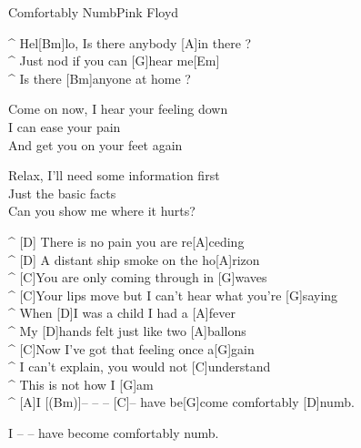 \begin{song}{Comfortably Numb}{Pink Floyd}

\begin{guitar}
^ Hel[Bm]lo, Is there anybody [A]in there ?\\
^ Just nod if you can [G]hear me[Em]\\
^ Is there [Bm]anyone at home ?\\
\end{guitar}

\begin{guitar}
Come on now, I hear your feeling down\\
I can ease your pain\\
And get you on your feet again\\
\end{guitar}

\begin{guitar}
Relax, I'll need some information first\\
Just the basic facts\\
Can you show me where it hurts?\\
\end{guitar}

\medskip
{}
\begin{guitar}
^ [D] There is no pain you are re[A]ceding\\
^ [D] A distant ship smoke on the ho[A]rizon\\
^ [C]You are only coming through in [G]waves\\
^ [C]Your lips move but I can't hear what you're [G]saying\\
^ When [D]I was a child I had a [A]fever\\
^ My [D]hands felt just like two [A]ballons\\
^ [C]Now I've got that feeling once a[G]gain\\
^ I can't explain, you would not [C]understand\\
^ This is not how I [G]am\\
^ [A]I [(Bm)]– – – [C]– have be[G]come comfortably [D]numb.\\
\end{guitar}

\medskip
{}
\medskip

\begin{guitar}
I – – have become comfortably numb.\\
\end{guitar}


\end{song}
